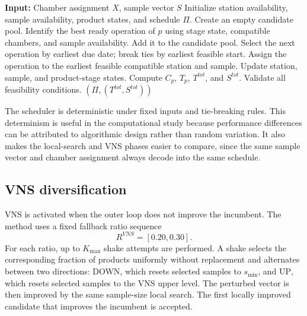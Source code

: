 \documentclass[11pt]{article}
\begin{document}
\begin{algorithm}[H]
\caption{EDD-based schedule construction}
\label{alg:scheduler_short}
\begin{algorithmic}[1]
\State \textbf{Input:} Chamber assignment \(X\), sample vector \(S\)
\State Initialize station availability, sample availability, product states, and schedule \(\Pi\).
    \State Create an empty candidate pool.
        \State Identify the best ready operation of \(p\) using stage state, compatible chambers, and sample availability.
            \State Add it to the candidate pool.
        \EndIf
    \EndFor
    \State Select the next operation by earliest due date; break ties by earliest feasible start.
    \State Assign the operation to the earliest feasible compatible station and sample.
    \State Update station, sample, and product-stage states.
\EndWhile
\State Compute \(C_p\), \(T_p\), \(T^{tot}\), and \(S^{tot}\).
\State Validate all feasibility conditions.
\State \Return \((\Pi,(T^{tot},S^{tot}))\)
\end{algorithmic}
\end{algorithm}

The scheduler is deterministic under fixed inputs and tie-breaking rules. This determinism is useful in the computational study because performance differences can be attributed to algorithmic design rather than random variation. It also makes the local-search and VNS phases easier to compare, since the same sample vector and chamber assignment always decode into the same schedule.

\subsection{VNS diversification}
\label{subsec:vns}

VNS is activated when the outer loop does not improve the incumbent. The method uses a fixed fallback ratio sequence
\[
R^{VNS}=[0.20,0.30].
\]
For each ratio, up to \(K_{\max}\) shake attempts are performed. A shake selects the corresponding fraction of products uniformly without replacement and alternates between two directions: \textsc{DOWN}, which resets selected samples to \(s_{\min}\), and \textsc{UP}, which resets selected samples to the VNS upper level. The perturbed vector is then improved by the same sample-size local search. The first locally improved candidate that improves the incumbent is accepted.
\end{document}
